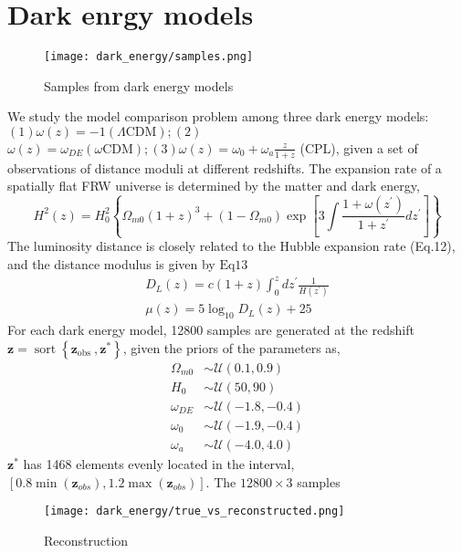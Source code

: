 \section{Dark enrgy models}
\begin{figure}
	\centering
	\texttt{[image: dark\_energy/samples.png]}
	\caption{Samples from dark energy models}
	\label{fig:dark_energy_samples}
\end{figure}
We study the model comparison problem among three dark energy models: $(1) \omega(z)=-1(\Lambda \mathrm{CDM}) ;(2)$ $\omega(z)=\omega_{D E}(\omega \mathrm{CDM}) ;(3) \omega(z)=\omega_{0}+\omega_{a} \frac{z}{1+z}$ (CPL), given a set of observations of distance moduli at different redshifts. The expansion rate of a spatially flat FRW universe is determined by the matter and dark energy,
$$
H^{2}(z)=H_{0}^{2}\left\{\Omega_{m 0}(1+z)^{3}+\left(1-\Omega_{m 0}\right) \exp \left[3 \int \frac{1+\omega\left(z^{\prime}\right)}{1+z^{\prime}} d z^{\prime}\right]\right\}
$$
The luminosity distance is closely related to the Hubble expansion rate (Eq.12), and the distance modulus is given by $\mathrm{Eq} 13$
$$
\begin{gathered}
D_{L}(z)=c(1+z) \int_{0}^{z} d z^{\prime} \frac{1}{H\left(z^{\prime}\right)} \\
\mu(z)=5 \log _{10} D_{L}(z)+25
\end{gathered}
$$
For each dark energy model, 12800 samples are generated at the redshift $\boldsymbol{z}=\operatorname{sort}\left\{\boldsymbol{z}_{\text {obs }}, \boldsymbol{z}^{*}\right\}$, given the priors of the parameters as,
$$
\begin{aligned}
\Omega_{m 0} & \sim \mathcal{U}(0.1,0.9) \\
H_{0} & \sim \mathcal{U}(50,90) \\
\omega_{D E} & \sim \mathcal{U}(-1.8,-0.4) \\
\omega_{0} & \sim \mathcal{U}(-1.9,-0.4) \\
\omega_{a} & \sim \mathcal{U}(-4.0,4.0)
\end{aligned}
$$
$\boldsymbol{z}^{*}$ has 1468 elements evenly located in the interval, $\left[0.8 \min \left(\boldsymbol{z}_{o b s}\right), 1.2 \max \left(\boldsymbol{z}_{o b s}\right)\right]$. The $12800 \times 3$ samples
\begin{figure}
	\centering
	\texttt{[image: dark\_energy/true\_vs\_reconstructed.png]}
	\caption{Reconstruction}
	\label{fig:recon_de}
\end{figure}